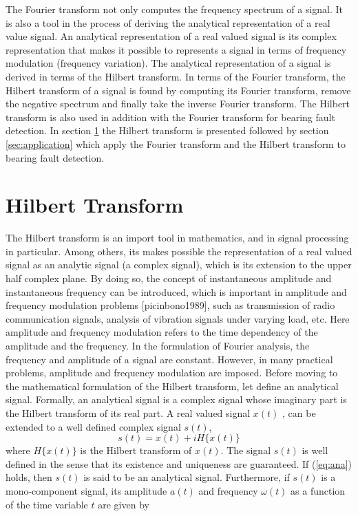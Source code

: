 \documentclass[../Main/thesis.tex]{subfiles}
\begin{document}
\justify
The Fourier transform not only computes the frequency spectrum of a signal. It is also a tool in the process of deriving the analytical representation of a real value signal. An analytical representation of a real valued signal is its complex representation that makes it possible to represents a signal in terms of frequency modulation (frequency variation). The analytical representation of a signal is derived in terms of the Hilbert transform. In terms of the Fourier transform, the Hilbert transform of a signal is found by computing its Fourier transform, remove the negative spectrum and finally take the inverse Fourier transform. The Hilbert transform is also used in addition with the Fourier transform for bearing fault detection. In section \ref{sec:ht} the Hilbert transform is presented followed by section \ref{sec:application} which apply the Fourier transform and the Hilbert transform to bearing fault detection.

\section{Hilbert Transform}
\label{sec:ht}

The Hilbert transform is an import tool in mathematics, and in signal processing in particular. Among others, its makes possible the representation of a real valued signal as an analytic signal (a complex signal), which is its extension to the upper half complex plane. By doing so, the concept of instantaneous amplitude and instantaneous frequency can be introduced, which is important in amplitude and frequency modulation problems [picinbono1989], such as transmission of radio communication signals, analysis of vibration signals under varying load, etc. Here amplitude and frequency modulation refers to the time dependency of the amplitude and the frequency. In the formulation of Fourier analysis, the frequency and amplitude of a signal are constant. However, in many  practical problems, amplitude and frequency modulation are imposed.
\justify
Before moving to the mathematical formulation of the Hilbert transform, let define an analytical signal.
Formally, an analytical signal is a complex signal whose imaginary part is the Hilbert transform of its real part. A real valued signal $x(t)$ , can be extended to a well defined complex signal $s(t)$, 
\begin{equation}\label{eq:ana}
s(t) = x(t) + i H\{ x(t)\}
\end{equation}
where $H\{ x(t)\}$ is the Hilbert transform of $x(t)$. The signal $s(t)$ is well defined in the sense that its existence and uniqueness are guaranteed. If (\ref{eq:ana}) holds, then $s(t)$ is said to be an analytical signal. Furthermore, if $s(t)$ is a mono-component signal, its amplitude $a(t)$ and frequency $\omega(t)$ as a function of the time variable $t$ are given by
\end{document}
